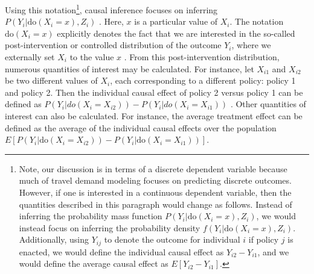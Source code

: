 Using this notation\footnote{Note, our discussion is in terms of a discrete dependent variable because much of travel demand modeling focuses on predicting discrete outcomes. However, if one is interested in a continuous dependent variable, then the quantities described in this paragraph would change as follows. Instead of inferring the probability mass function $P \left( Y_i | \textrm{do} \left( X_i = x \right), Z_i \right)$, we would instead focus on inferring the probability density $f \left( Y_i | \textrm{do} \left( X_i = x \right), Z_i \right)$. Additionally, using $Y_{ij}$ to denote the outcome for individual $i$ if policy $j$ is enacted, we would define the individual causal effect as $Y_{i2} - Y_{i1}$, and we would define the average causal effect as $E \left[ Y_{i2} - Y_{i1} \right]$.}, causal inference focuses on inferring $P \left( Y_i | \textrm{do} \left( X_i = x \right), Z_i \right)$ \citep[Section 3.2.1]{pearl2009statistics}. Here, $x$ is a particular value of $X_i$. The notation $\textrm{do} \left( X_i = x \right)$ explicitly denotes the fact that we are interested in the so-called post-intervention or controlled distribution of the outcome $Y_i$, where we externally set $X_i$ to the value $x$ \citep{pearl_2014_external}. From this post-intervention distribution, numerous quantities of interest may be calculated. For instance, let $X_{i1}$ and $X_{i2}$ be two different values of $X_i$, each corresponding to a different policy: policy 1 and policy 2. Then the individual causal effect of policy 2 versus policy 1 can be defined as $P \left( Y_i | do \left( X_i = X_{i2} \right) \right) - P \left( Y_i | do \left( X_i = X_{i1} \right) \right)$ \citep[Section 8.2.1]{pearl2009statistics}. Other quantities of interest can also be calculated. For instance, the average treatment effect can be defined as the average of the individual causal effects over the population $E \left[ P\left( Y_i | \textrm{do} \left( X_i = X_{i2} \right) \right) - P\left( Y_i | \textrm{do} \left( X_i = X_{i1} \right) \right) \right]$. 

